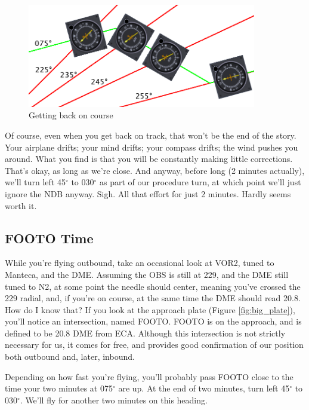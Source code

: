 \begin{figure}
  \begin{center}
    \includegraphics[width=10cm]{img/NDB_flying}
    \caption{Getting back on course}
    \label{fig:NDB_flying}
  \end{center}
\end{figure}

Of course, even when you get back on track, that won't be the end of
the story.  Your airplane drifts; your mind drifts; your compass
drifts; the wind pushes you around.  What you find is that you will be
constantly making little corrections.  That's okay, as long as we're
close.  And anyway, before long (2 minutes actually), we'll turn left
45$^\circ$ to 030$^\circ$ as part of our procedure turn, at which
point we'll just ignore the NDB anyway.  Sigh.  All that effort for
just 2 minutes.  Hardly seems worth it.

\subsection{FOOTO Time}

While you're flying outbound, take an occasional look at VOR2, tuned
to Manteca, and the DME.  Assuming the OBS is still at 229, and the
DME still tuned to N2, at some point the needle should center, meaning
you've crossed the 229 radial, and, if you're on course, at the same
time the DME should read 20.8.  How do I know that?  If you look at
the approach plate (Figure \ref{fig:big_plate}), you'll notice an
intersection, named FOOTO.  FOOTO is on the approach, and is defined
to be 20.8 DME from ECA.  Although this intersection is not strictly
necessary for us, it comes for free, and provides good confirmation of
our position both outbound and, later, inbound.

Depending on how fast you're flying, you'll probably pass FOOTO close
to the time your two minutes at 075$^\circ$ are up.  At the end of two
minutes, turn left 45$^\circ$ to 030$^\circ$.  We'll fly for another
two minutes on this heading.

